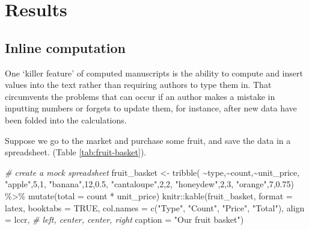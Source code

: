 \documentclass[smallextended]{svjour3}       %
\newenvironment{Shaded}{\begin{snugshade}}{\end{snugshade}}
\newcommand{\AttributeTok}[1]{\textcolor[rgb]{0.77,0.63,0.00}{#1}}
\newcommand{\CommentTok}[1]{\textcolor[rgb]{0.56,0.35,0.01}{\textit{#1}}}
\newcommand{\ConstantTok}[1]{\textcolor[rgb]{0.00,0.00,0.00}{#1}}
\newcommand{\DecValTok}[1]{\textcolor[rgb]{0.00,0.00,0.81}{#1}}
\newcommand{\FloatTok}[1]{\textcolor[rgb]{0.00,0.00,0.81}{#1}}
\newcommand{\FunctionTok}[1]{\textcolor[rgb]{0.00,0.00,0.00}{#1}}
\newcommand{\NormalTok}[1]{#1}
\newcommand{\OtherTok}[1]{\textcolor[rgb]{0.56,0.35,0.01}{#1}}
\newcommand{\SpecialCharTok}[1]{\textcolor[rgb]{0.00,0.00,0.00}{#1}}
\newcommand{\StringTok}[1]{\textcolor[rgb]{0.31,0.60,0.02}{#1}}
\begin{document}
\hypertarget{results}{%
\section{Results}\label{results}}

\hypertarget{sec:1}{%
\subsection{Inline computation}\label{sec:1}}

One `killer feature' of computed manuscripts is the ability to compute and insert values into the text rather than requiring authors to type them in. That circumvents the problems that can occur if an author makes a mistake in inputting numbers or forgets to update them, for instance, after new data have been folded into the calculations.

Suppose we go to the market and purchase some fruit, and save the data in a spreadsheet. (Table \ref{tab:fruit-basket}).

\begin{Shaded}
\begin{Highlighting}[]
\CommentTok{\# create a mock spreadsheet}
\NormalTok{fruit\_basket }\OtherTok{\textless{}{-}} \FunctionTok{tribble}\NormalTok{(}
  \SpecialCharTok{\textasciitilde{}}\NormalTok{type,}\SpecialCharTok{\textasciitilde{}}\NormalTok{count,}\SpecialCharTok{\textasciitilde{}}\NormalTok{unit\_price,}
  \StringTok{"apple"}\NormalTok{,}\DecValTok{5}\NormalTok{,}\DecValTok{1}\NormalTok{,}
  \StringTok{"banana"}\NormalTok{,}\DecValTok{12}\NormalTok{,}\FloatTok{0.5}\NormalTok{,}
  \StringTok{"cantaloupe"}\NormalTok{,}\DecValTok{2}\NormalTok{,}\DecValTok{2}\NormalTok{,}
  \StringTok{"honeydew"}\NormalTok{,}\DecValTok{2}\NormalTok{,}\DecValTok{3}\NormalTok{,}
  \StringTok{"orange"}\NormalTok{,}\DecValTok{7}\NormalTok{,}\FloatTok{0.75}\NormalTok{) }\SpecialCharTok{\%\textgreater{}\%}
  \FunctionTok{mutate}\NormalTok{(}\AttributeTok{total =}\NormalTok{ count }\SpecialCharTok{*}\NormalTok{ unit\_price)}
\NormalTok{knitr}\SpecialCharTok{::}\FunctionTok{kable}\NormalTok{(fruit\_basket, }\AttributeTok{format =} \StringTok{\textquotesingle{}latex\textquotesingle{}}\NormalTok{, }\AttributeTok{booktabs =} \ConstantTok{TRUE}\NormalTok{, }
             \AttributeTok{col.names =} \FunctionTok{c}\NormalTok{(}\StringTok{"Type"}\NormalTok{, }\StringTok{"Count"}\NormalTok{, }\StringTok{"Price"}\NormalTok{, }\StringTok{"Total"}\NormalTok{),}
             \AttributeTok{align =} \StringTok{\textquotesingle{}lccr\textquotesingle{}}\NormalTok{, }\CommentTok{\# left, center, center, right}
             \AttributeTok{caption =} \StringTok{"Our fruit basket"}\NormalTok{)}
\end{Highlighting}
\end{Shaded}
\end{document}
